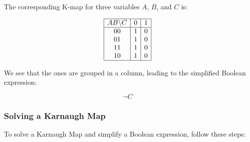 The corresponding K-map for three variables \(A\), \(B\), and \(C\) is:

\[
	\begin{array}{|c|c|c|c|}
		\hline
		AB \backslash C & 0 & 1 \\
		\hline
		00              & 1 & 0 \\
		01              & 1 & 0 \\
		11              & 1 & 0 \\
		10              & 1 & 0 \\
		\hline
	\end{array}
\]

We see that the ones are grouped in a column, leading to the simplified Boolean expression:

\[
	\neg C
\]

\subsubsection{Solving a Karnaugh Map}

To solve a Karnaugh Map and simplify a Boolean expression, follow these steps:

